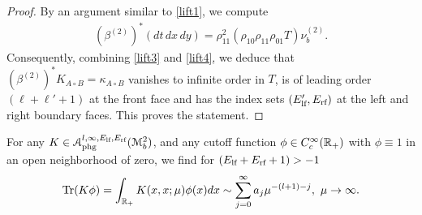 \begin{proof}
By an argument similar to \eqref{lift1}, we compute
\begin{equation}
\begin{split}
\left(\beta^{(2)}\right)^*(dt \, dx\, dy)=\rho_{11}^{2} \left(\rho_{10}\rho_{11}\rho_{01} T\right) \nu^{(2)}_b .
\end{split}
\label{lift4}
\end{equation}
Consequently, combining \eqref{lift3} and \eqref{lift4}, we deduce that 
$(\beta^{(2)})^* K_{A \circ B}=\kappa_{A\circ B}$ 
vanishes to infinite order in $T$, is of leading order $(\ell + \ell'+1)$ at 
the front face and has the index sets $(E'_{\lf}, E_{\rf})$ 
at the left and right boundary faces. 
This proves the statement.
\end{proof}

\begin{prop}
\label{trace-boundary}
For any $K \in 
\mathscr{A}_{\textup{phg}}^{l,\infty,E_{\textup{lf}}, E_{\textup{rf}}}(\mathscr{M}^2_b)$, 
and any cutoff function $\phi \in C^\infty_c(\R_+)$ with $\phi \equiv 1$ 
in an open neighborhood of zero, we find for $(E_{\textup{lf}} + E_{\textup{rf}} + 1) >-1$ 
\begin{align}
\textup{Tr} (K\phi) = \int_{\R_+} K(x,x; \mu)\phi(x) dx \sim \sum_{j=0}^\infty 
a_j \mu^{-(l+1)-j}, \ \mu \to \infty.
\end{align} 
\end{prop}

